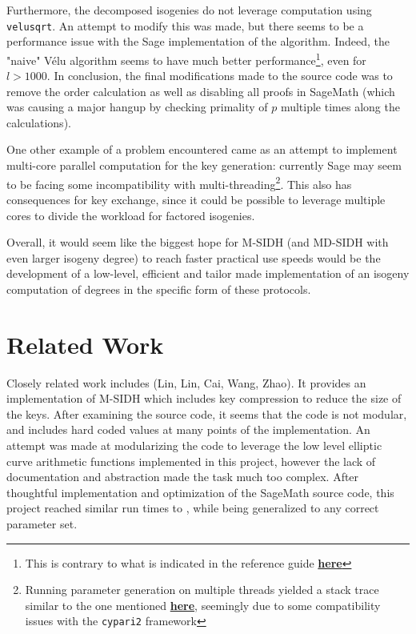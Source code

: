\documentclass[a4paper,11pt,oneside]{report}
\begin{document}
    Furthermore, the decomposed isogenies do not leverage computation using \texttt{velusqrt}. An attempt to modify this was made, but there seems to be a performance issue with the Sage implementation of the algorithm. Indeed, the "naive" Vélu algorithm seems to have much better performance\footnote{This is contrary to what is indicated in the reference guide \textbf{\href{https://doc.sagemath.org/html/en/reference/arithmetic_curves/sage/schemes/elliptic\_curves/hom_velusqrt.html}{here}}}, even for $l > 1000$. 
    In conclusion, the final modifications made to the source code was to remove the order calculation as well as disabling all proofs in SageMath (which was causing a major hangup by checking primality of $p$ multiple times along the calculations).
    
    One other example of a problem encountered came as an attempt to implement multi-core parallel computation for the key generation: currently Sage may seem to be facing some incompatibility with multi-threading\footnote{Running parameter generation on multiple threads yielded a stack trace similar to the one mentioned 
    \textbf{\href{https://github.com/sagemath/cypari2/issues/107}{here}}, seemingly due to some compatibility issues with the \texttt{cypari2} framework
    }. This also has consequences for key exchange, since it could be possible to leverage multiple cores to divide the workload for factored isogenies.
    
    Overall, it would seem like the biggest hope for M-SIDH (and MD-SIDH with even larger isogeny degree) to reach faster practical use speeds would be the development of a low-level, efficient and tailor made implementation of an isogeny computation of degrees in the specific form of these protocols.

\chapter{Related Work}

Closely related work includes \cite{compression} (Lin, Lin, Cai, Wang, Zhao). It provides an implementation of M-SIDH which includes key compression to reduce the size of the keys. After examining the source code, it seems that the code is not modular, and includes hard coded values at many points of the implementation. An attempt was made at modularizing the code to leverage the low level elliptic curve arithmetic functions implemented in this project, however the lack of documentation and abstraction made the task much too complex. After thoughtful implementation and optimization of the SageMath source code, this project reached similar run times to \cite{compression}, while being generalized to any correct parameter set. 
\end{document}
